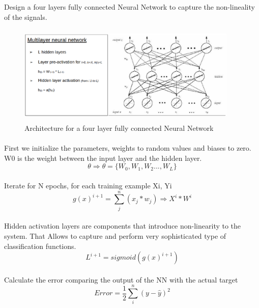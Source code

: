 \documentclass{llncs}       %
\begin{document}
Design a four layers fully connected Neural Network to capture the non-lineality of the signals.

\begin{figure}[h]
\centering
\includegraphics[width=10.51cm,height=4.77cm]{media/deep-nn.eps}
\caption{Architecture for a four layer fully connected 
Neural Network}
\end{figure}


\paragraph{}
First we initialize the parameters, weights to random values and biases to zero. W0 is the weight between the input layer and the hidden layer.
\begin{equation} 
\theta\Rightarrow\theta=\{W_{0},W_{1},W_{2}...,W_{L}\}
\end{equation}

\paragraph{}Iterate for N epochs,  for each training example Xi, Yi 
\begin{equation} 
g(x)^{i+1}=\sum_j^n(x_{j}*w_{j})\Rightarrow X^{i}*W^{i}
\end{equation}

\paragraph{}
Hidden activation layers are components that introduce non-linearity to 
the system. That Allows to capture and perform very sophisticated type 
of classification functions.
\begin{equation} 
L^{i+1}=sigmoid(g(x)^{i+1})
\end{equation}

\paragraph{}Calculate the error comparing the output of the NN with the actual target 
\begin{equation} 
Error = \frac{1}{2}\sum_i^n( y -\widehat{y})^2
\end{equation}
\end{document}
